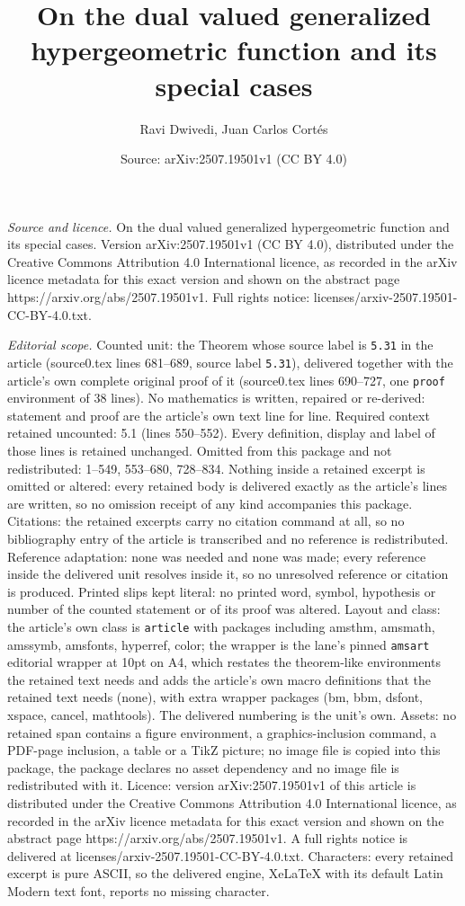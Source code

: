 \documentclass[10pt,a4paper]{amsart}
\title[On the dual valued generalized hypergeometric function and i]{On the dual valued generalized hypergeometric function and its special cases}
\author{Ravi Dwivedi, Juan Carlos Cort\'es}
\date{Source: arXiv:2507.19501v1 (CC BY 4.0)}
\begin{document}
\maketitle

\noindent\emph{Source and licence.} On the dual valued generalized hypergeometric function and its special cases. Version arXiv:2507.19501v1 (CC BY 4.0), distributed under the Creative Commons Attribution 4.0 International licence, as recorded in the arXiv licence metadata for this exact version and shown on the abstract page https://arxiv.org/abs/2507.19501v1. Full rights notice: licenses/arxiv-2507.19501-CC-BY-4.0.txt.\par\smallskip

\noindent\textit{Editorial scope.} Counted unit: the Theorem whose source label is \texttt{5.31} in the article (source0.tex lines 681--689, source label \texttt{5.31}), delivered together with the article's own complete original proof of it (source0.tex lines 690--727, one \texttt{proof} environment of 38 lines). No mathematics is written, repaired or re-derived: statement and proof are the article's own text line for line. Required context retained uncounted: 5.1 (lines 550--552). Every definition, display and label of those lines is retained unchanged. Omitted from this package and not redistributed: 1--549, 553--680, 728--834. Nothing inside a retained excerpt is omitted or altered: every retained body is delivered exactly as the article's lines are written, so no omission receipt of any kind accompanies this package. Citations: the retained excerpts carry no citation command at all, so no bibliography entry of the article is transcribed and no reference is redistributed. Reference adaptation: none was needed and none was made; every reference inside the delivered unit resolves inside it, so no unresolved reference or citation is produced. Printed slips kept literal: no printed word, symbol, hypothesis or number of the counted statement or of its proof was altered. Layout and class: the article's own class is \texttt{article} with packages including amsthm, amsmath, amssymb, amsfonts, hyperref, color; the wrapper is the lane's pinned \texttt{amsart} editorial wrapper at 10pt on A4, which restates the theorem-like environments the retained text needs and adds the article's own macro definitions that the retained text needs (none), with extra wrapper packages (bm, bbm, dsfont, xspace, cancel, mathtools). The delivered numbering is the unit's own. Assets: no retained span contains a figure environment, a graphics-inclusion command, a PDF-page inclusion, a table or a TikZ picture; no image file is copied into this package, the package declares no asset dependency and no image file is redistributed with it. Licence: version arXiv:2507.19501v1 of this article is distributed under the Creative Commons Attribution 4.0 International licence, as recorded in the arXiv licence metadata for this exact version and shown on the abstract page https://arxiv.org/abs/2507.19501v1. A full rights notice is delivered at licenses/arxiv-2507.19501-CC-BY-4.0.txt. Characters: every retained excerpt is pure ASCII, so the delivered engine, XeLaTeX with its default Latin Modern text font, reports no missing character.
\end{document}
